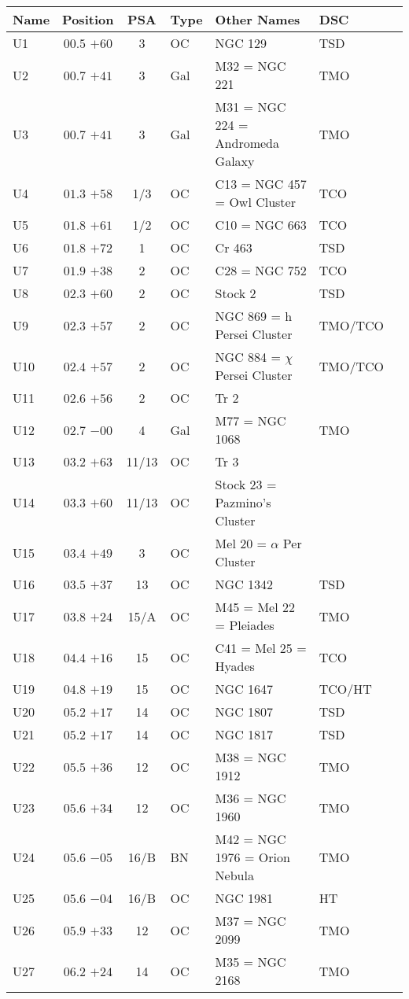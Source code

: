 \begin{table}[p]
\setlength{\tabcolsep}{2pt}
\small
\begin{tabular}{lccllll}
\hline
Name&Position&PSA&Type&Other Names&DSC\\
\hline
U1  &$00.5$ $+60$&3&OC &NGC 129& TSD \\
U2  &$00.7$ $+41$&3&Gal&M32 = NGC 221& TMO \\
U3  &$00.7$ $+41$&3&Gal&M31 = NGC 224 = Andromeda Galaxy& TMO \\
U4  &$01.3$ $+58$&1/3&OC &C13 = NGC 457 = Owl Cluster& TCO \\
U5  &$01.8$ $+61$&1/2&OC &C10 = NGC 663& TCO \\
U6  &$01.8$ $+72$&1&OC &Cr 463& TSD \\
U7  &$01.9$ $+38$&2&OC &C28 = NGC 752& TCO \\
U8  &$02.3$ $+60$&2&OC &Stock 2& TSD \\
U9  &$02.3$ $+57$&2&OC &NGC 869 = h Persei Cluster& TMO/TCO \\
U10 &$02.4$ $+57$&2&OC &NGC 884 = $\chi$ Persei Cluster& TMO/TCO \\
U11 &$02.6$ $+56$&2&OC &Tr 2&  \\
U12 &$02.7$ $-00$&4&Gal&M77 = NGC 1068& TMO \\
U13 &$03.2$ $+63$&11/13&OC &Tr 3&  \\
U14 &$03.3$ $+60$&11/13&OC &Stock 23 = Pazmino's Cluster&  \\
U15 &$03.4$ $+49$&3&OC &Mel 20 = $\alpha$ Per Cluster&  \\
U16 &$03.5$ $+37$&13&OC &NGC 1342& TSD \\
U17 &$03.8$ $+24$&15/A&OC &M45 = Mel 22 = Pleiades& TMO \\
U18 &$04.4$ $+16$&15&OC &C41 = Mel 25 = Hyades& TCO \\
U19 &$04.8$ $+19$&15&OC &NGC 1647& TCO/HT  \\
U20 &$05.2$ $+17$&14&OC &NGC 1807& TSD \\
U21 &$05.2$ $+17$&14&OC &NGC 1817& TSD \\
U22 &$05.5$ $+36$&12&OC &M38 = NGC 1912& TMO \\
U23 &$05.6$ $+34$&12&OC &M36 = NGC 1960& TMO \\
U24 &$05.6$ $-05$&16/B&BN &M42 = NGC 1976 = Orion Nebula& TMO \\
U25 &$05.6$ $-04$&16/B&OC &NGC 1981& HT  \\
U26 &$05.9$ $+33$&12&OC &M37 = NGC 2099& TMO \\
U27 &$06.2$ $+24$&14&OC &M35 = NGC 2168& TMO \\

\end{tabular}
\end{table}
